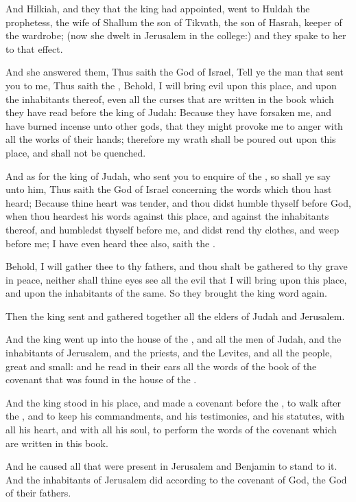 \verse And Hilkiah, and they that the king had appointed, went to Huldah the prophetess, the wife of Shallum the son of Tikvath, the son of Hasrah, keeper of the wardrobe; (now she dwelt in Jerusalem in the college:) and they spake to her to that effect.

\verse And she answered them, Thus saith the \LORD God of Israel, Tell ye the man that sent you to me, \verse Thus saith the \LORD, Behold, I will bring evil upon this place, and upon the inhabitants thereof, even all the curses that are written in the book which they have read before the king of Judah: \verse Because they have forsaken me, and have burned incense unto other gods, that they might provoke me to anger with all the works of their hands; therefore my wrath shall be poured out upon this place, and shall not be quenched.

\verse And as for the king of Judah, who sent you to enquire of the \LORD, so shall ye say unto him, Thus saith the \LORD God of Israel concerning the words which thou hast heard; \verse Because thine heart was tender, and thou didst humble thyself before God, when thou heardest his words against this place, and against the inhabitants thereof, and humbledst thyself before me, and didst rend thy clothes, and weep before me; I have even heard thee also, saith the \LORD.

\verse Behold, I will gather thee to thy fathers, and thou shalt be gathered to thy grave in peace, neither shall thine eyes see all the evil that I will bring upon this place, and upon the inhabitants of the same. So they brought the king word again.

\verse Then the king sent and gathered together all the elders of Judah and Jerusalem.

\verse And the king went up into the house of the \LORD, and all the men of Judah, and the inhabitants of Jerusalem, and the priests, and the Levites, and all the people, great and small: and he read in their ears all the words of the book of the covenant that was found in the house of the \LORD.

\verse And the king stood in his place, and made a covenant before the \LORD, to walk after the \LORD, and to keep his commandments, and his testimonies, and his statutes, with all his heart, and with all his soul, to perform the words of the covenant which are written in this book.

\verse And he caused all that were present in Jerusalem and Benjamin to stand to it. And the inhabitants of Jerusalem did according to the covenant of God, the God of their fathers.

